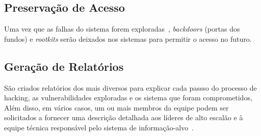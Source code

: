 \subsection{ Preservação de Acesso}
Uma vez que as falhas do sistema forem exploradas~\cite{broad}, \emph{backdoors} (portas dos fundos) e \emph{rootkits} serão deixados nos sistemas para permitir o acesso no futuro.
 
\subsection{Geração de Relatórios}

São criados relatórios dos mais diversos para explicar cada passso do processo de hacking, as vulnerabilidades exploradas e os sistema que foram comprometidos, Além disso, em vários casos, um ou mais membros da equipe podem ser solicitados a fornecer uma descrição detalhada aos líderes de alto escalão e à equipe técnica responsável pelo sistema de informação-alvo~\cite{broad}.





